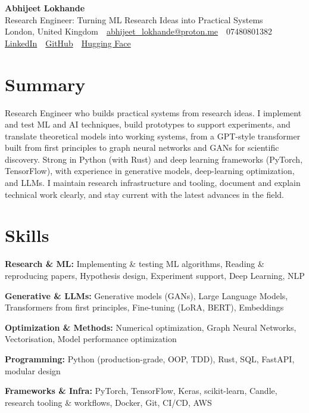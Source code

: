 \documentclass[10pt,a4paper]{article}
\newcommand{\sep}{\,\textcolor{accent!60}{\textbar}\,}
\begin{document}
\begin{center}
  {\fontsize{24}{26}\selectfont\bfseries Abhijeet Lokhande}\\[3pt]
  {\color{accent}\large Research Engineer: Turning ML Research Ideas into Practical Systems}\\[5pt]
  {\small
    London, United Kingdom \sep
    \href{mailto:abhijeet_lokhande@proton.me}{abhijeet\_lokhande@proton.me} \sep
    07480801382 \\[2pt]
    \href{https://www.linkedin.com/in/ablds/}{LinkedIn} \sep
    \href{https://github.com/abhijeetscode}{GitHub} \sep
    \href{https://huggingface.co/ab-ai}{Hugging Face}
  }
\end{center}
\vspace{2pt}

\section{Summary}
Research Engineer who builds practical systems from research ideas. I implement and test ML and AI techniques, build prototypes to support experiments, and translate theoretical models into working systems, from a GPT-style transformer built from first principles to graph neural networks and GANs for scientific discovery. Strong in Python (with Rust) and deep learning frameworks (PyTorch, TensorFlow), with experience in generative models, deep-learning optimization, and LLMs. I maintain research infrastructure and tooling, document and explain technical work clearly, and stay current with the latest advances in the field.

\section{Skills}
\begin{tight}
  \item[\textcolor{accent}{\small$\bullet$}] \textbf{Research \& ML:} Implementing \& testing ML algorithms, Reading \& reproducing papers, Hypothesis design, Experiment support, Deep Learning, NLP
  \item[\textcolor{accent}{\small$\bullet$}] \textbf{Generative \& LLMs:} Generative models (GANs), Large Language Models, Transformers from first principles, Fine-tuning (LoRA, BERT), Embeddings
  \item[\textcolor{accent}{\small$\bullet$}] \textbf{Optimization \& Methods:} Numerical optimization, Graph Neural Networks, Vectorisation, Model performance optimization
  \item[\textcolor{accent}{\small$\bullet$}] \textbf{Programming:} Python (production-grade, OOP, TDD), Rust, SQL, FastAPI, modular design
  \item[\textcolor{accent}{\small$\bullet$}] \textbf{Frameworks \& Infra:} PyTorch, TensorFlow, Keras, scikit-learn, Candle, research tooling \& workflows, Docker, Git, CI/CD, AWS
\end{tight}
\end{document}

